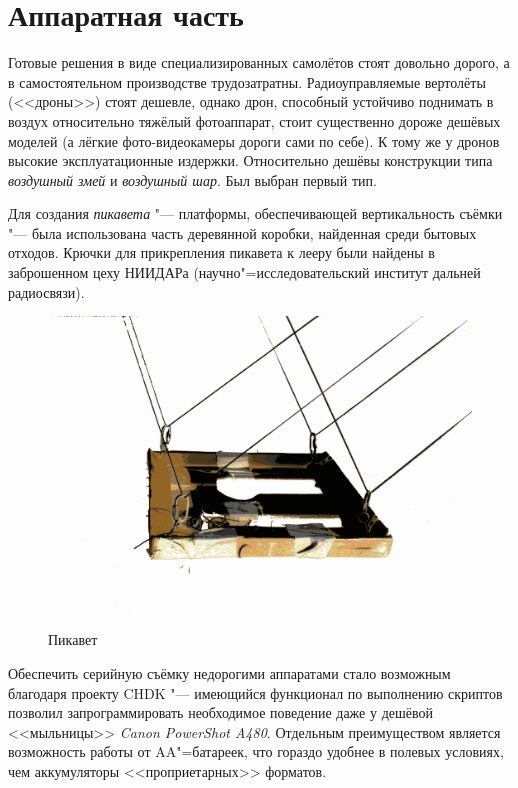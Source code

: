\documentclass[10pt, a5paper]{article}
\begin{document}
\section*{Аппаратная часть}

Готовые решения в виде специализированных самолётов стоят довольно дорого, а в самостоятельном производстве трудозатратны. Радиоуправляемые вертолёты (<<дроны>>) стоят дешевле, однако дрон, способный устойчиво поднимать в воздух относительно тяжёлый фотоаппарат, стоит существенно дороже дешёвых моделей (а лёгкие фото-видеокамеры дороги сами по себе). К тому же у дронов высокие эксплуатационные издержки. Относительно дешёвы конструкции типа \emph{воздушный змей} и \emph{воздушный шар}. Был выбран первый тип.

Для создания \emph{пикавета} "--- платформы, обеспечивающей вертикальность съёмки "--- была использована часть деревянной коробки, найденная среди бытовых отходов. Крючки для прикрепления пикавета к лееру были найдены в заброшенном цеху НИИДАРа (научно"=исследовательский институт дальней радиосвязи).

\begin{figure}[h!]
  \centering \label{samsonov1}
  \includegraphics[scale=0.1]{14_2015_picavet-color-1}
  \caption{Пикавет}
\end{figure}


Обеспечить серийную съёмку недорогими аппаратами стало возможным благодаря проекту CHDK "--- имеющийся функционал по выполнению скриптов позволил запрограммировать необходимое поведение даже у дешёвой <<мыльницы>> \emph{Canon PowerShot A480}. Отдельным преимуществом является возможность работы от AA"=батареек, что гораздо удобнее в полевых условиях, чем аккумуляторы <<проприетарных>> форматов.
\end{document}
